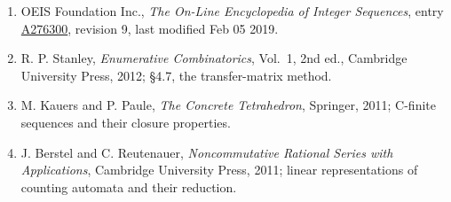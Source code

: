 \documentclass[11pt]{article}
\theoremstyle{definition}
\begin{document}
\begin{enumerate}

\item OEIS Foundation Inc., \emph{The On-Line Encyclopedia of Integer Sequences}, entry \href{https://oeis.org/A276300}{A276300}, revision 9, last modified Feb 05 2019.

\item R. P. Stanley, \emph{Enumerative Combinatorics}, Vol.~1, 2nd ed., Cambridge University Press, 2012; \S4.7, the transfer-matrix method.

\item M. Kauers and P. Paule, \emph{The Concrete Tetrahedron}, Springer, 2011; C-finite sequences and their closure properties.

\item J. Berstel and C. Reutenauer, \emph{Noncommutative Rational Series with Applications}, Cambridge University Press, 2011; linear representations of counting automata and their reduction.

\end{enumerate}
\end{document}

